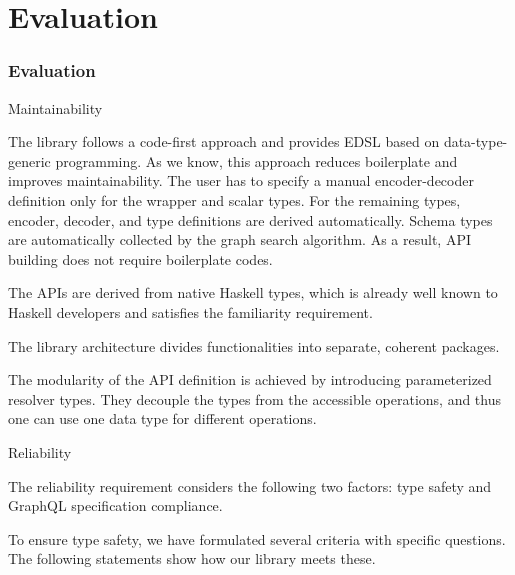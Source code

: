 \section{Evaluation}

\begin{frame}\frametitle{Evaluation}

\begin{block}{Maintainability}

  \begin{itemize}
  
     The library follows a code-first approach and provides EDSL based on data-type-generic programming. As we know, this approach reduces boilerplate and improves maintainability. %
    The user has to specify a manual encoder-decoder definition only for the wrapper and scalar types. For the remaining types, encoder, decoder, and type definitions are derived automatically.
    Schema types are automatically collected by 
    the graph search algorithm. As a result, API building does not require boilerplate codes.

     The APIs are derived from native Haskell types, which is already well known to Haskell developers and satisfies the familiarity requirement.  

      The library architecture divides functionalities into separate, coherent packages. 
    
      The modularity of the API definition is achieved by introducing parameterized resolver types. They decouple the types from the accessible operations, and thus one can use one data type for different operations.

  \end{itemize}

\end{block}


\begin{block}{Reliability}

The reliability requirement considers the following two factors: type safety and GraphQL specification compliance.

\begin{itemize}

   To ensure type safety, we have formulated several criteria with specific questions. The following statements show how our library meets these.
    
    \begin{enumerate}


\end{enumerate}
\end{itemize}
\end{block}
\end{frame}
